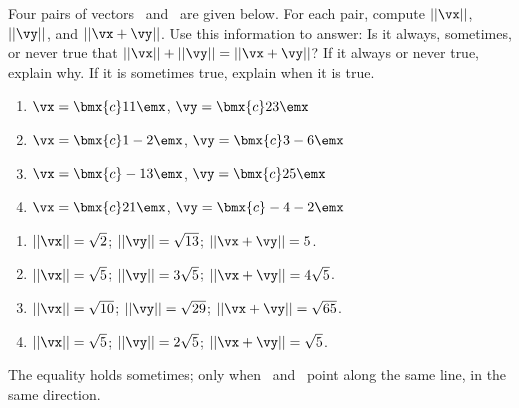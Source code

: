 {Four pairs of vectors \vx\ and \vy\ are given below. For each pair, compute $||\vx||$, $||\vy||$, and $||\vx + \vy||$. Use this information to answer: Is it always, sometimes, or never true that $||\vx|| + ||\vy|| = ||\vx+\vy||$? If it always or never true, explain why. If it is sometimes true, explain when it is true.
\begin{enumerate}
\item		$\vx = \bmx{c} 1\\1\emx$, $\vy = \bmx{c} 2\\3\emx$
\item		$\vx = \bmx{c} 1\\-2\emx$, $\vy = \bmx{c} 3\\-6\emx$
\item		$\vx = \bmx{c} -1\\3\emx$, $\vy = \bmx{c} 2\\5\emx$
\item		$\vx = \bmx{c} 2\\1\emx$, $\vy = \bmx{c} -4\\-2\emx$
\end{enumerate}
}
{
\begin{enumerate}
\item		$||\vx|| = \sqrt{2}$; $||\vy|| = \sqrt{13}$; $||\vx+\vy|| = 5$.
\item		$||\vx|| = \sqrt{5}$; $||\vy|| = 3\sqrt{5}$; $||\vx+\vy|| = 4\sqrt{5}$.
\item		$||\vx|| = \sqrt{10}$; $||\vy|| = \sqrt{29}$; $||\vx+\vy|| = \sqrt{65}$.
\item		$||\vx|| = \sqrt{5}$; $||\vy|| = 2\sqrt{5}$; $||\vx+\vy|| = \sqrt{5}$.
\end{enumerate}
The equality holds sometimes; only when \vx\ and \vy\ point along the same line, in the same direction.
}
